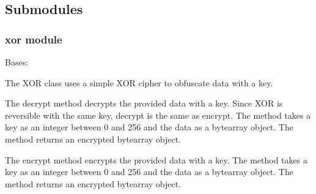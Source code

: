 \documentclass[letterpaper,12pt,openany,oneside]{sphinxmanual}
\begin{document}
\subsection{Submodules}
\label{Encryption:submodules}

\subsubsection{xor module}
\label{Encryption:xor-module}\label{Encryption:module-Encryption.xor}

\begin{fulllineitems}
\label{Encryption:Encryption.xor.XOR}
Bases: 

The XOR class uses a simple XOR cipher to obfuscate data with a key.

\begin{fulllineitems}
\label{Encryption:Encryption.xor.XOR.decrypt}
The decrypt method decrypts the provided data with a key.
Since XOR is reversible with the same key, decrypt is the
same as encrypt.
The method takes a key as an integer between 0 and 256 and
the data as a bytearray object.
The method returns an encrypted bytearray object.

\end{fulllineitems}


\begin{fulllineitems}
\label{Encryption:Encryption.xor.XOR.encrypt}
The encrypt method encrypts the provided data with a key.
The method takes a key as an integer between 0 and 256 and
the data as a bytearray object.
The method returns an encrypted bytearray object.

\end{fulllineitems}


\end{fulllineitems}
\end{document}
